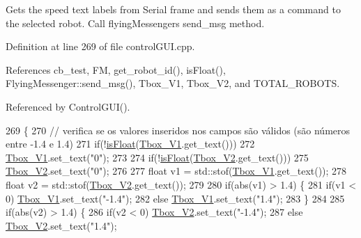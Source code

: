 Gets the speed text labels from \textquotesingle{}Serial\textquotesingle{} frame and sends them as a command to the selected robot. Call flying\+Messenger\textquotesingle{}s send\+\_\+msg method. 



Definition at line 269 of file control\+G\+U\+I.\+cpp.



References cb\+\_\+test, FM, get\+\_\+robot\+\_\+id(), is\+Float(), Flying\+Messenger\+::send\+\_\+msg(), Tbox\+\_\+\+V1, Tbox\+\_\+\+V2, and T\+O\+T\+A\+L\+\_\+\+R\+O\+B\+O\+TS.



Referenced by Control\+G\+U\+I().


\begin{DoxyCode}
269                             \{
270     \textcolor{comment}{// verifica se os valores inseridos nos campos são válidos (são números entre -1.4 e 1.4)}
271     \textcolor{keywordflow}{if}(!\hyperlink{class_control_g_u_i_ad2912b87e92a5db7125da7264c57cbde}{isFloat}(\hyperlink{class_control_g_u_i_a8c9b9a41a7ac7de9a7c1c323f70e43b4}{Tbox\_V1}.get\_text()))
272         \hyperlink{class_control_g_u_i_a8c9b9a41a7ac7de9a7c1c323f70e43b4}{Tbox\_V1}.set\_text(\textcolor{stringliteral}{"0"});
273 
274     \textcolor{keywordflow}{if}(!\hyperlink{class_control_g_u_i_ad2912b87e92a5db7125da7264c57cbde}{isFloat}(\hyperlink{class_control_g_u_i_ad4ec00b7d15236b0b8e6723e115c190a}{Tbox\_V2}.get\_text()))
275         \hyperlink{class_control_g_u_i_ad4ec00b7d15236b0b8e6723e115c190a}{Tbox\_V2}.set\_text(\textcolor{stringliteral}{"0"});
276 
277     \textcolor{keywordtype}{float} v1 = std::stof(\hyperlink{class_control_g_u_i_a8c9b9a41a7ac7de9a7c1c323f70e43b4}{Tbox\_V1}.get\_text());
278     \textcolor{keywordtype}{float} v2 = std::stof(\hyperlink{class_control_g_u_i_ad4ec00b7d15236b0b8e6723e115c190a}{Tbox\_V2}.get\_text());
279 
280     \textcolor{keywordflow}{if}(abs(v1) > 1.4) \{
281         \textcolor{keywordflow}{if}(v1 < 0) \hyperlink{class_control_g_u_i_a8c9b9a41a7ac7de9a7c1c323f70e43b4}{Tbox\_V1}.set\_text(\textcolor{stringliteral}{"-1.4"});
282         \textcolor{keywordflow}{else} \hyperlink{class_control_g_u_i_a8c9b9a41a7ac7de9a7c1c323f70e43b4}{Tbox\_V1}.set\_text(\textcolor{stringliteral}{"1.4"});
283     \}
284 
285     \textcolor{keywordflow}{if}(abs(v2) > 1.4) \{
286         \textcolor{keywordflow}{if}(v2 < 0) \hyperlink{class_control_g_u_i_ad4ec00b7d15236b0b8e6723e115c190a}{Tbox\_V2}.set\_text(\textcolor{stringliteral}{"-1.4"});
287         \textcolor{keywordflow}{else} \hyperlink{class_control_g_u_i_ad4ec00b7d15236b0b8e6723e115c190a}{Tbox\_V2}.set\_text(\textcolor{stringliteral}{"1.4"});

\end{DoxyCode}
